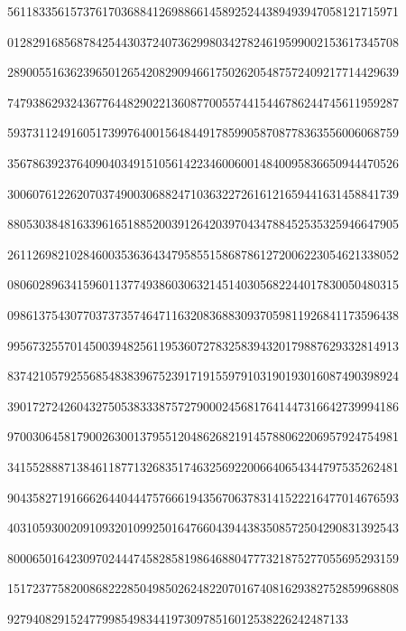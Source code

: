56118335615737617036884126988661458925244389493947058121715971\par
01282916856878425443037240736299803427824619599002153617345708\par
28900551636239650126542082909466175026205487572409217714429639\par
74793862932436776448290221360877005574415446786244745611959287\par
59373112491605173997640015648449178599058708778363556006068759\par
35678639237640904034915105614223460060014840095836650944470526\par
30060761226207037490030688247103632272616121659441631458841739\par
88053038481633961651885200391264203970434788452535325946647905\par
26112698210284600353636434795855158687861272006223054621338052\par
08060289634159601137749386030632145140305682244017830050480315\par
09861375430770373735746471163208368830937059811926841173596438\par
99567325570145003948256119536072783258394320179887629332814913\par
83742105792556854838396752391719155979103190193016087490398924\par
39017272426043275053833387572790002456817641447316642739994186\par
97003064581790026300137955120486268219145788062206957924754981\par
34155288871384611877132683517463256922006640654344797535262481\par
90435827191666264404447576661943567063783141522216477014676593\par
40310593002091093201099250164766043944383508572504290831392543\par
80006501642309702444745828581986468804777321875277055695293159\par
15172377582008682228504985026248220701674081629382752859968808\par
927940829152477998549834419730978516012538226242487133\par
